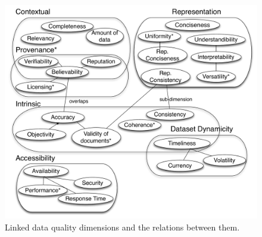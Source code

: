 \begin{figure}[htb]
\includegraphics[width=5in]{DimensionsRelations.pdf}
\caption{Linked data quality dimensions and the relations between them.}
\label{fig:dimrel}
\end{figure}
